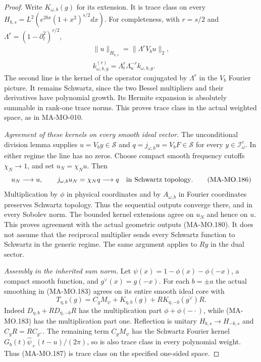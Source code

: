 \begin{proof}
Write \(K_{\omega,b}(g)\) for its extension. It is trace
class on every \(H_{b,s}=L^2(e^{2bx}(1+x^2)^{s/2}dx)\).
For completeness, with \(r=s/2\) and
\(\Lambda^r=(1-\partial_t^2)^{r/2}\),
\[
 \begin{gathered}
       \|u\|_{H_{b,s}}=\|\Lambda^rV_bu\|_2,\\
 k^{(r)}_{\omega,b,g}
                  =\Lambda_t^r\Lambda_u^{-r}k_{\omega,b,g}.
 \end{gathered}
 \tag{MA-MO.185}
\]
The second line is the kernel of the operator conjugated by
\(\Lambda^r\) in the \(V_b\) Fourier picture. It remains
Schwartz, since the two Bessel multipliers and their
derivatives have polynomial growth. Its Hermite expansion
is absolutely summable in rank-one trace norms. This proves
trace class in the actual weighted space, as in MA-MO-010.

\emph{Agreement of these kernels on every smooth ideal vector.}
The unconditional division lemma supplies
\(u=V_by\in\mathscr S\) and
\(q=j_{\omega,b}u=V_bF\in\mathscr S\) for every
\(y\in\mathscr I^c_\omega\). In either regime the line
has no zeros. Choose compact smooth frequency cutoffs
\(\chi_N\to1\), and set \(u_N=\chi_Nu\). Then
\[
       u_N\longrightarrow u,\qquad
       j_{\omega,b}u_N=\chi_Nq\longrightarrow q
                              \quad\hbox{in Schwartz topology}.
 \tag{MA-MO.186}
\]
Multiplication by \(\phi\) in physical coordinates and
by \(A_{\omega,b}\) in Fourier coordinates preserves
Schwartz topology. Thus the sequential outputs converge
there, and in every Sobolev norm. The bounded kernel
extensions agree on \(u_N\) and hence on \(u\).
This proves agreement with the actual geometric outputs
(MA-MO.180). It does not assume that the reciprocal
multiplier sends every Schwartz function to Schwartz
in the generic regime. The same argument applies to
\(Ry\) in the dual sector.

\emph{Assembly in the inherited sum norm.}
Let \(\psi(x)=1-\phi(x)-\phi(-x)\), a compact smooth
function, and \(g^\vee(x)=g(-x)\). For each \(b=\pm a\)
the actual smoothing in (MA-MO.183) agrees on its entire
smooth ideal core with
\[
        T_{\eta,b}(g)=C_gM_\psi+K_{\eta,b}(g)
                                +RK_{\overline\eta,-b}(g^\vee)R.
 \tag{MA-MO.187}
\]
Indeed \(D_{\eta,b}+RD_{\overline\eta,-b}R\) has
the multiplication part \(\phi+\phi(-\cdot)\), while
(MA-MO.183) has the multiplication part one.
Reflection is unitary \(H_{b,s}\to H_{-b,s}\) and
\(C_gR=RC_{g^\vee}\). The remaining term \(C_gM_\psi\)
has the Schwartz Fourier kernel
\(G_b(t)\widehat\psi_+(t-u)/(2\pi)\), so is also
trace class in every polynomial weight. Thus (MA-MO.187)
is trace class on the specified one-sided space.


\end{proof}
